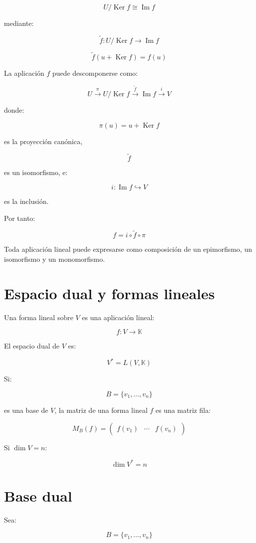 \documentclass[11pt,a4paper]{article}
\newcommand{\K}{\mathbb{K}}
\newcommand{\Ker}{\operatorname{Ker}}
\newcommand{\Ima}{\operatorname{Im}}
\begin{document}
\[
\boxed{
U/\Ker f
\cong
\Ima f
}
\]

mediante:

\[
\widetilde f:
U/\Ker f
\longrightarrow
\Ima f
\]

\[
\widetilde f(u+\Ker f)=f(u)
\]

La aplicación $f$ puede descomponerse como:

\[
U
\xrightarrow{\pi}
U/\Ker f
\xrightarrow{\widetilde f}
\Ima f
\xrightarrow{i}
V
\]

donde:

\[
\pi(u)=u+\Ker f
\]

es la proyección canónica,

\[
\widetilde f
\]

es un isomorfismo, e:

\[
i:\Ima f\hookrightarrow V
\]

es la inclusión.

Por tanto:

\[
\boxed{
f=i\circ\widetilde f\circ\pi
}
\]

Toda aplicación lineal puede expresarse como composición de un epimorfismo, un isomorfismo y un monomorfismo.

\section{Espacio dual y formas lineales}

Una forma lineal sobre $V$ es una aplicación lineal:

\[
f:V\longrightarrow\K
\]

El espacio dual de $V$ es:

\[
\boxed{
V^*=L(V,\K)
}
\]

Si:

\[
B=\{v_1,\ldots,v_n\}
\]

es una base de $V$, la matriz de una forma lineal $f$ es una matriz fila:

\[
\boxed{
M_B(f)
=
\begin{pmatrix}
f(v_1)&\cdots&f(v_n)
\end{pmatrix}
}
\]

Si $\dim V=n$:

\[
\boxed{
\dim V^*=n
}
\]

\section{Base dual}

Sea:

\[
B=\{v_1,\ldots,v_n\}
\]
\end{document}
